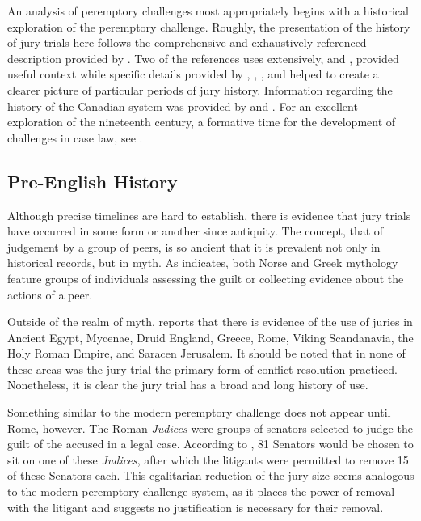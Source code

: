 An analysis of peremptory challenges most appropriately begins with a
historical exploration of the peremptory challenge. Roughly,
the presentation of the history of jury trials here follows the comprehensive and exhaustively referenced description provided by
\cite{hoffman1997}. Two of the references \citeauthor{hoffman1997} uses extensively, \cite{hansvidjudging} and
\cite{vandykejurysel}, provided useful context while specific details provided by \cite{vonmosch1921}, \cite{forsythhistory},
\cite{brown1978}, and \cite{brown2000} helped to create a clearer picture of particular periods of jury history. Information
regarding the history of the Canadian system was provided by \cite{brown2000} and \cite{petersen1993}. For an excellent
exploration of the nineteenth century, a formative time for the development of challenges in case law, see \cite{brown2000}.

\subsection{Pre-English History}

Although precise timelines are hard to establish, there is evidence that jury trials have occurred in some form or another since
antiquity. The concept, that of judgement by a group of peers, is so ancient that it is prevalent not only in historical records,
but in myth. As \cite{hoffman1997} indicates, both Norse and Greek mythology feature groups of individuals assessing the guilt or
collecting evidence about the actions of a peer.

Outside of the realm of myth, \cite{hoffman1997} reports that there is evidence of the use of juries in Ancient Egypt, Mycenae,
Druid England, Greece, Rome, Viking Scandanavia, the Holy Roman Empire, and Saracen Jerusalem. It should be noted that in none of
these areas was the jury trial the primary form of conflict resolution practiced. Nonetheless, it is clear the jury trial has a
broad and long history of use.

Something similar to the modern peremptory challenge does not appear until Rome, however. The Roman \textit{Judices} were groups
of senators selected to judge the guilt of the accused in a legal case. According to \cite{hoffman1997}, 81 Senators would be
chosen to sit on one of these \textit{Judices}, after which the litigants were permitted to remove 15 of these Senators
each. This egalitarian reduction of the jury size seems analogous to the modern peremptory challenge system, as it places the
power of removal with the litigant and suggests no justification is necessary for their removal.

